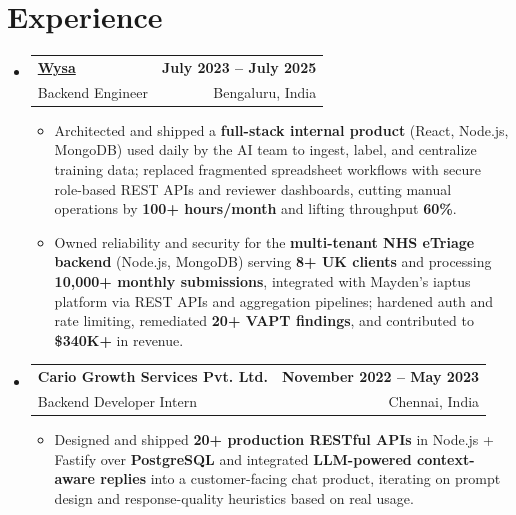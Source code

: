 \documentclass[letterpaper,10pt]{article}
\makeatletter
\newcommand{\resumeItem}[1]{
  \item\small{#1\vspace{-1pt}}
}
\newcommand{\resumeSubheading}[4]{
  \vspace{1pt}\item
    \begin{tabular*}{0.985\textwidth}[t]{l@{\extracolsep{\fill}}r}
      \textbf{#1} & \textbf{\small #2} \\
      {\small\color{ResumeSlate} #3} & {\small\color{ResumeSlate} #4} \\
    \end{tabular*}\vspace{-6pt}
}
\newcommand{\resumeSubHeadingListStart}{\begin{itemize}[leftmargin=0.0in, label={}, itemsep=2pt, topsep=2pt]}
\newcommand{\resumeSubHeadingListEnd}{\end{itemize}}
\newcommand{\resumeItemListStart}{\begin{itemize}[leftmargin=0.18in, itemsep=2pt, topsep=1pt]}
\newcommand{\resumeItemListEnd}{\end{itemize}\vspace{-4pt}}
\makeatother
\begin{document}
\section{Experience}
\resumeSubHeadingListStart
  \resumeSubheading
    {\href{https://www.wysa.io}{Wysa}}{July 2023 -- July 2025}
    {Backend Engineer}{Bengaluru, India}
    \resumeItemListStart
      \resumeItem{Architected and shipped a \textbf{full-stack internal product} (React, Node.js, MongoDB) used daily by the AI team to ingest, label, and centralize training data; replaced fragmented spreadsheet workflows with secure role-based REST APIs and reviewer dashboards, cutting manual operations by \textbf{100+ hours/month} and lifting throughput \textbf{60\%}.}
      \resumeItem{Owned reliability and security for the \textbf{multi-tenant NHS eTriage backend} (Node.js, MongoDB) serving \textbf{8+ UK clients} and processing \textbf{10{,}000+ monthly submissions}, integrated with Mayden's iaptus platform via REST APIs and aggregation pipelines; hardened auth and rate limiting, remediated \textbf{20+ VAPT findings}, and contributed to \textbf{\$340K+} in revenue.}
    \resumeItemListEnd
  \resumeSubheading
    {Cario Growth Services Pvt. Ltd.}{November 2022 -- May 2023}
    {Backend Developer Intern}{Chennai, India}
    \resumeItemListStart
      \resumeItem{Designed and shipped \textbf{20+ production RESTful APIs} in Node.js + Fastify over \textbf{PostgreSQL} and integrated \textbf{LLM-powered context-aware replies} into a customer-facing chat product, iterating on prompt design and response-quality heuristics based on real usage.}
    \resumeItemListEnd
\resumeSubHeadingListEnd
\vspace{-4pt}
\end{document}
